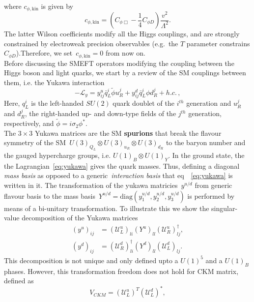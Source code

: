 where $c_{\phi,\mathrm{kin}}$ is given by
\begin{equation}
	c_{\phi,\mathrm{kin}} = \left( C_{\phi\Box} -\frac{1}{4} C_{\phi D}\right) \frac{v^2}{\Lambda^2}.
\end{equation}
The latter Wilson coefficients modify all the Higgs couplings, and are strongly constrained by electroweak precision observables (e.g.~the $T$ parameter constrains $C_{\phi D}$).Therefore, we set~$c_{\phi,\mathrm{kin}}=0$ from now on.\\
Before discussing the SMEFT operators modifying the coupling between the Higgs boson and light quarks, we start by a review of the SM couplings between them, i.e. the Yukawa interaction
\begin{equation}
	-\mathcal{L}_{y}=y^u_{ij} \bar{q}_L^i \tilde{\phi} u_R^j + y^d_{ij} \bar{q}_L^i \phi d_R^j +h.c.\,,
	\label{eq:yukawa}
\end{equation}
Here, $q_L^i$ is the left-handed $SU(2)$ quark doublet of the $i^{th}$ generation and $u_R^j$ and $d_R^j$, the right-handed up- and down-type fields of the $j^{th}$ generation, respectively, and $\tilde{\phi}=i \sigma_2 \phi^*$. \\ The $3 \times3$ Yukawa matrices are the SM \textbf{spurions} that break the flavour symmetry of the SM~$U(3)_{Q_L}\otimes U(3)_{u_R}\otimes U(3)_{d_R}$ to the baryon number and the gauged hypercharge groups, i.e. $U(1)_B\otimes U(1)_Y$. In the ground state, the the Lagrangian~\eqref{eq:yukawa} gives  the quark masses. Thus, defining a diagonal \emph{mass basis} as opposed to a generic~\emph{interaction basis} that eq~~\eqref{eq:yukawa} is written in it. 
The transformation of the yukawa matricies~$y^{u/d}$ from generic flavour basis to the mass basis~$Y^{u/d} = \mathrm{diag}(y_1^{u/d},y_2^{u/d},y_3^{u/d})$ is performed by means of a bi-unitary transformation. To illustrate this we show the singular-value decomposition of the Yukawa matrices
\begin{align}
	(y^u)_{ij}&= (\mathcal{U}_{L}^{u})_{li} (Y^{u})_{ll} (\mathcal{U}_R^{u})^\dagger_{lj},\nonumber \\
	(y^d)_{ij}&=(\mathcal{U}_{R}^{d})^\dagger_{li} (Y^{d})_{ll} (\mathcal{U}_L^{d})_{lj}.
	\label{eq:yuksvd}
\end{align}
This decomposition is not unique and only defined upto a $U(1)^5$ and a $U(1)_B$ phases. However, this transformation freedom does not hold for CKM matrix, defined as
\begin{equation}
	V_{CKM} = (\mathcal{U}_{L}^{u})^T (\mathcal{U}_L^{d})^*,
\end{equation}
